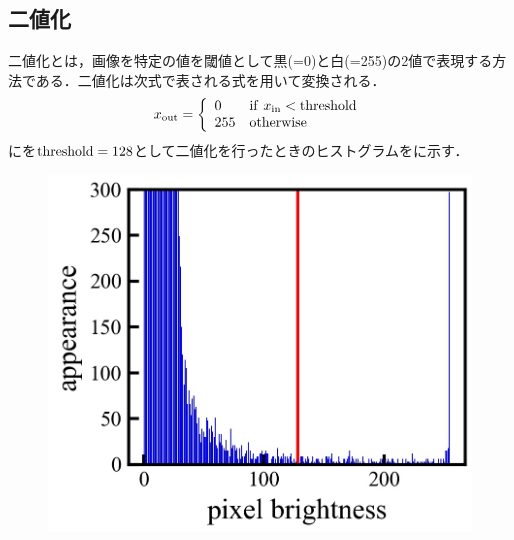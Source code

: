 \subsection{二値化}
二値化とは，画像を特定の値を閾値として黒(=0)と白(=255)の2値で表現する方法である．二値化は次式で表される式を用いて変換される．
\large
\begin{align}\label{eq:binary_trans}
	x_{\rm out} = 
	\left\{ 
	\begin{array}{ll}
		0 & {\rm if} \ x_{\rm in} < {\rm threshold} \\
		255 & {\rm otherwise}
	\end{array} \right.
\end{align}
\normalsize
{}にを${\rm threshold} = 128$として二値化を行ったときのヒストグラムをに示す．
\begin{figure}[h]
	\begin{center}
		\begin{minipage}{0.3\linewidth}
			\includegraphics[width=0.98\columnwidth]{./theory/figure/5/thre_norm_hist_0.jpg}
		\end{minipage}
		\begin{minipage}{0.3\linewidth}

\end{minipage}
\end{center}
\end{figure}
